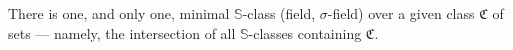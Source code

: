 There is one, and only one, minimal $\mathbb{S}$-class (field, $\sigma$-field) over a given class $\mathfrak{C}$ of sets — namely, the intersection of all $\mathbb{S}$-classes containing $\mathfrak{C}$.
